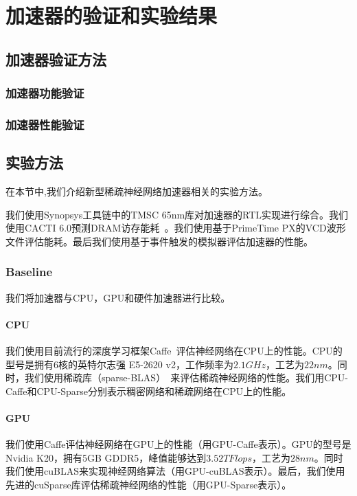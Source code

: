 \chapter{加速器的验证和实验结果}

\section{加速器验证方法}

\subsection{}

\subsection{加速器功能验证}

\subsection{加速器性能验证}

\section{实验方法}
在本节中,我们介绍新型稀疏神经网络加速器相关的实验方法。

我们使用Synopsys工具链中的TMSC 65nm库对加速器的RTL实现进行综合。我们使用CACTI 6.0预测DRAM访存能耗~\cite{muralimanohar2007optimizing}。我们使用基于PrimeTime PX的VCD波形文件评估能耗。最后我们使用基于事件触发的模拟器评估加速器的性能。

\subsection{Baseline}
我们将加速器与CPU，GPU和硬件加速器进行比较。

\subsubsection{CPU}
我们使用目前流行的深度学习框架Caffe~\cite{jia2014caffe}评估神经网络在CPU上的性能。CPU的型号是拥有6核的英特尔志强 E5-2620 v2，工作频率为$2.1GHz$，工艺为$22nm$。同时，我们使用稀疏库（sparse-BLAS）~\cite{duff2002overview}来评估稀疏神经网络的性能。我们用CPU-Caffe和CPU-Sparse分别表示稠密网络和稀疏网络在CPU上的性能。

\subsubsection{GPU}
我们使用Caffe评估神经网络在GPU上的性能（用GPU-Caffe表示）。GPU的型号是Nvidia K20，拥有5GB GDDR5，峰值能够达到$3.52TFlops$，工艺为$28nm$。同时我们使用cuBLAS来实现神经网络算法（用GPU-cuBLAS表示）。最后，我们使用先进的cuSparse库评估稀疏神经网络的性能（用GPU-Sparse表示）。

